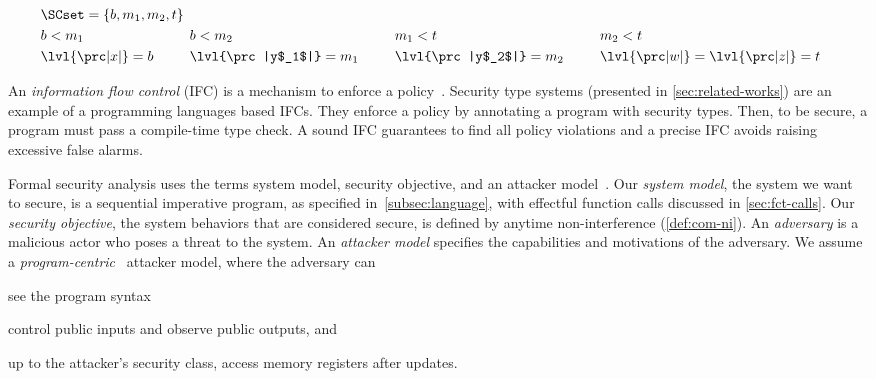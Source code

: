\noindent
\begin{minipage}{.68\textwidth}
    \noindent
    \begin{alignat*}{7}
        & \SCset = \{b, m_1, m_2, t\} \span \span \\ %
        & b < m_1 & \hspace{1.6em} & b < m_2 & \hspace{1.6em} & m_1 < t &\hspace{1.6em} & m_2 < t\\
        & \lvl{\prc|x|} = b && \lvl{\prc|y$_1$|} = m_1 && \lvl{\prc|y$_2$|}= m_2 && \lvl{\prc|w|} =  \lvl{\prc|z|}  = t
    \end{alignat*}
\end{minipage}
\begin{minipage}{.3\textwidth}
\end{minipage}

An \emph{information flow control} (IFC) is a mechanism to enforce a policy~\cite{bishop2003}.
Security type systems (presented in \autoref{sec:related-works}) are an example of a programming languages based IFCs.
They enforce a policy by annotating a program with security types.
Then, to be secure, a program must pass a compile-time type check.
A sound IFC guarantees to find all policy violations and a precise IFC avoids raising excessive false alarms.

Formal security analysis uses the terms system model, security objective, and an attacker model~\cite{bau2011,bognar2022}.
Our \emph{system model}, \ie the system we want to secure, is a sequential imperative program, as specified in~\autoref{subsec:language}, with effectful function calls discussed in \autoref{sec:fct-calls}.
Our \emph{security objective}, \ie the system behaviors that are considered secure, is defined by anytime non-interference (\autoref{def:com-ni}).
An \emph{adversary} is a malicious actor who poses a threat to the system.
An \emph{attacker model} specifies the capabilities and motivations of the adversary.
We assume a \emph{program-centric}~\cite{hedin2012} attacker model, where the adversary can
\begin{enumerate*}[label=(\roman*)]
\item see the program syntax
\item control public inputs and observe public outputs, and
\item up to the attacker's security class, access memory registers after updates.
\end{enumerate*}

